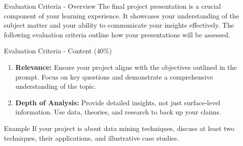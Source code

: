 \documentclass[aspectratio=169]{beamer}
\begin{document}
\begin{frame}[fragile]{Evaluation Criteria - Overview}
    The final project presentation is a crucial component of your learning experience. 
    It showcases your understanding of the subject matter and your ability to communicate your insights effectively. 
    The following evaluation criteria outline how your presentations will be assessed.
\end{frame}

\begin{frame}[fragile]{Evaluation Criteria - Content (40\%)}
    \begin{enumerate}
        \item \textbf{Relevance:} 
        Ensure your project aligns with the objectives outlined in the prompt. 
        Focus on key questions and demonstrate a comprehensive understanding of the topic.
        
        \item \textbf{Depth of Analysis:} 
        Provide detailed insights, not just surface-level information. 
        Use data, theories, and research to back up your claims.
    \end{enumerate}
    
    \begin{block}{Example}
    If your project is about data mining techniques, discuss at least two techniques, their applications, 
    and illustrative case studies.
    \end{block}
\end{frame}
\end{document}
